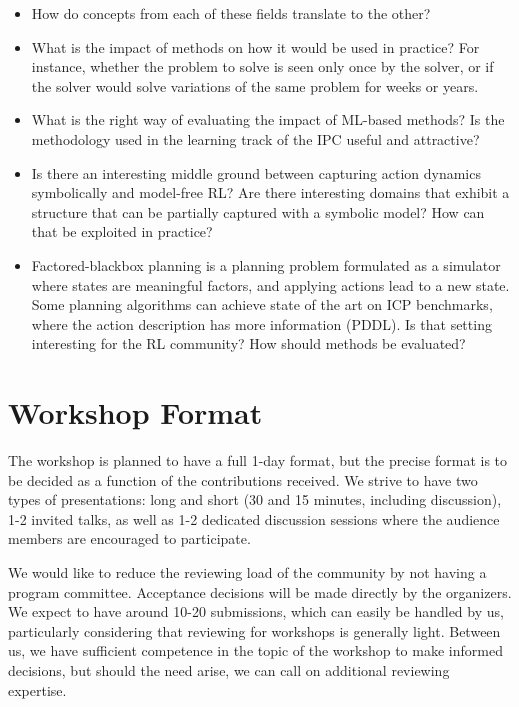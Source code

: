 \documentclass[10pt]{article}
\begin{document}
\begin{itemize}
\item How do concepts from each of these fields translate to the other?
%
%
\item What is the impact of methods on how it would be used in practice? For
instance, whether the problem to solve is seen only once by the solver, or if the solver would
solve variations of the same problem for weeks or years. 
%
\item What is the right way of evaluating the impact of ML-based methods? Is the
methodology used in the learning track of the IPC useful and attractive?
%
\item Is there an interesting middle ground between capturing action dynamics
symbolically and model-free RL? Are there interesting domains that exhibit a
structure that can be partially captured with a symbolic model? How can that be
exploited in practice?
%
\item Factored-blackbox planning is a planning problem formulated as a simulator
where states are meaningful factors, and applying actions lead to a new state.
Some planning algorithms can achieve state of the art on ICP benchmarks, where the action description has more information (PDDL). Is that setting
interesting for the RL community? How should methods be evaluated?
\end{itemize}

\section*{Workshop Format}

The workshop is planned to have a full 1-day format, but the precise format is
to be decided as a function of the contributions received. We strive to have two
types of presentations: long and short (30 and 15 minutes, including
discussion), 1-2 invited talks, as well as 1-2 dedicated discussion sessions
where the audience members are encouraged to participate.

We would like to reduce the reviewing load of the community by not having a
program committee. Acceptance decisions will be made directly by the organizers.
We expect to have around 10-20 submissions, which can easily be handled by us,
particularly considering that reviewing for workshops is generally light.
Between us, we have sufficient competence in the topic of the workshop to make
informed decisions, but should the need arise, we can call on additional
reviewing expertise.
\end{document}
